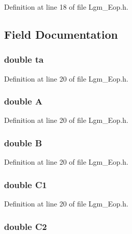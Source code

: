 Definition at line 18 of file Lgm\_\-Eop.h.

\subsection{Field Documentation}
\hypertarget{struct_lgm___nga_eopp_dca44f25fa586684a49891f7d5b58ca1}{
\subsubsection[{ta}]{\setlength{\rightskip}{0pt plus 5cm}double {\bf ta}}}
\label{struct_lgm___nga_eopp_dca44f25fa586684a49891f7d5b58ca1}




Definition at line 20 of file Lgm\_\-Eop.h.\hypertarget{struct_lgm___nga_eopp_2941385b1be5280d3b1f546356f7ec99}{
\subsubsection[{A}]{\setlength{\rightskip}{0pt plus 5cm}double {\bf A}}}
\label{struct_lgm___nga_eopp_2941385b1be5280d3b1f546356f7ec99}




Definition at line 20 of file Lgm\_\-Eop.h.\hypertarget{struct_lgm___nga_eopp_df085adbf76beb194ac436d42cd1d725}{
\subsubsection[{B}]{\setlength{\rightskip}{0pt plus 5cm}double {\bf B}}}
\label{struct_lgm___nga_eopp_df085adbf76beb194ac436d42cd1d725}




Definition at line 20 of file Lgm\_\-Eop.h.\hypertarget{struct_lgm___nga_eopp_d69d2b382d336189251f264999f56bfa}{
\subsubsection[{C1}]{\setlength{\rightskip}{0pt plus 5cm}double {\bf C1}}}
\label{struct_lgm___nga_eopp_d69d2b382d336189251f264999f56bfa}




Definition at line 20 of file Lgm\_\-Eop.h.\hypertarget{struct_lgm___nga_eopp_666af5280f39c3ddcafb7c01e55192a2}{
\subsubsection[{C2}]{\setlength{\rightskip}{0pt plus 5cm}double {\bf C2}}}
\label{struct_lgm___nga_eopp_666af5280f39c3ddcafb7c01e55192a2}




